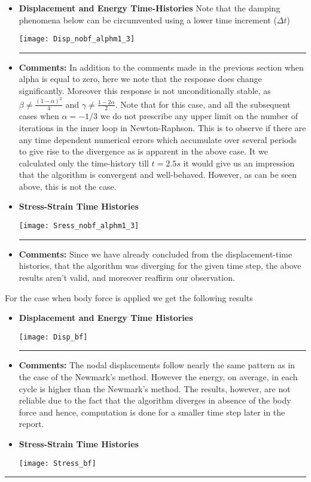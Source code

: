\begin{itemize}
\item {\bf Displacement and Energy Time-Histories} Note that the damping phenomena below can be circumvented using a lower time increment ($\Delta t$)
\begin{center}
\texttt{[image: Disp\_nobf\_alphm1\_3]}
\end{center}\hrule
\item { \bf Comments: } In addition to the comments made in the previous section when alpha is equal to zero, here we note that the response does change significantly. Moreover this response is not unconditionally stable, as $\beta\neq\frac{(1-\alpha)^2}{4}$ and $\gamma\neq\frac{1-2\alpha}{2}$. Note that for this case, and all the subsequent cases when $\alpha = -1/3$ we do not prescribe any upper limit on the number of iterations in the inner loop in Newton-Raphson. This is to observe if there are any time dependent numerical errors which accumulate over several periods to give rise to the divergence as is apparent in the above case. It we calculated only the time-history till $t=2.5s$ it would give us an impression that the algorithm is convergent and well-behaved. However, as can be seen above, this is not the case. 
\newpage 
\item {\bf Stress-Strain Time Histories}
\begin{center}
\texttt{[image: Sress\_nobf\_alphm1\_3]}
\end{center}\hrule
\item { \bf Comments: } Since we have already concluded from the displacement-time histories, that the algorithm was diverging for the given time step, the above results aren't valid, and moreover reaffirm our observation. 
\end{itemize}
\newpage
For the case when body force is applied we get the following results 
\begin{itemize}
\item {\bf Displacement and Energy Time Histories}
\begin{center}
\texttt{[image: Disp\_bf]}
\end{center}\hrule
\item {\bf Comments: } The nodal displacements follow nearly the same pattern as in the case of the Newmark's method. However the energy, on average, in each cycle is higher than the Newmark's method. The  results, however, are not reliable due to the fact that the algorithm diverges in absence of the body force and hence, computation is done for a smaller time step later in the report.  
\newpage
\item {\bf Stress-Strain Time Histories}
\begin{center}
\texttt{[image: Stress\_bf]}
\end{center} 
\end{itemize}
\hrule
